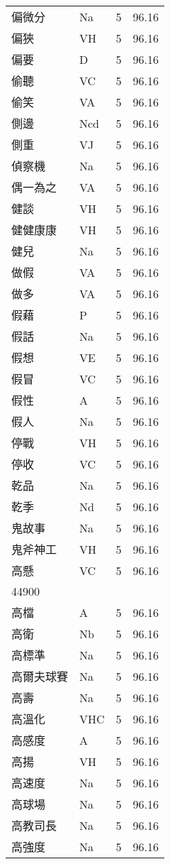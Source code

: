 \documentclass[twocolumn]{book}
\begin{document}
\begin{supertabular}{llrr}
偏微分 & Na & 5 &  96.16\\
偏狹 & VH & 5 &  96.16\\
偏要 & D & 5 &  96.16\\
偷聽 & VC & 5 &  96.16\\
偷笑 & VA & 5 &  96.16\\
側邊 & Ncd & 5 &  96.16\\
側重 & VJ & 5 &  96.16\\
偵察機 & Na & 5 &  96.16\\
偶一為之 & VA & 5 &  96.16\\
健談 & VH & 5 &  96.16\\
健健康康 & VH & 5 &  96.16\\
健兒 & Na & 5 &  96.16\\
做假 & VA & 5 &  96.16\\
做多 & VA & 5 &  96.16\\
假藉 & P & 5 &  96.16\\
假話 & Na & 5 &  96.16\\
假想 & VE & 5 &  96.16\\
假冒 & VC & 5 &  96.16\\
假性 & A & 5 &  96.16\\
假人 & Na & 5 &  96.16\\
停戰 & VH & 5 &  96.16\\
停收 & VC & 5 &  96.16\\
乾品 & Na & 5 &  96.16\\
乾季 & Nd & 5 &  96.16\\
鬼故事 & Na & 5 &  96.16\\
鬼斧神工 & VH & 5 &  96.16\\
高懸 & VC & 5 &  96.16\\
44900\\
高檔 & A & 5 &  96.16\\
高衛 & Nb & 5 &  96.16\\
高標準 & Na & 5 &  96.16\\
高爾夫球賽 & Na & 5 &  96.16\\
高壽 & Na & 5 &  96.16\\
高溫化 & VHC & 5 &  96.16\\
高感度 & A & 5 &  96.16\\
高揚 & VH & 5 &  96.16\\
高速度 & Na & 5 &  96.16\\
高球場 & Na & 5 &  96.16\\
高教司長 & Na & 5 &  96.16\\
高強度 & Na & 5 &  96.16\\

\end{supertabular}
\end{document}
